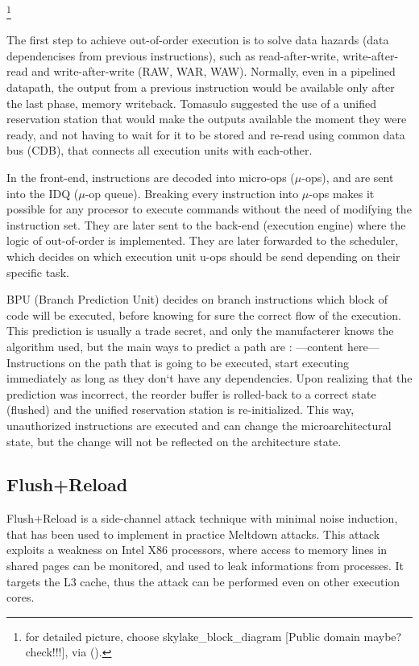 \documentclass[sigconf]{acmart}
\begin{document}
\footnote{ for detailed picture, choose skylake\_block\_diagram [Public domain maybe? check!!!], via (). }

The first step to achieve out-of-order execution is to solve data hazards (data dependencises from previous instructions), such as read-after-write, write-after-read and write-after-write (RAW, WAR, WAW). Normally, even in a pipelined datapath, the output from a previous instruction would be available only after the last phase, memory writeback. Tomasulo \cite{Cohen07} suggested the use of a unified reservation station that would make the outputs available the moment they were ready, and not having to wait for it to be stored and re-read using common data bus (CDB), that connects all execution units with each-other. 

In the front-end, instructions are decoded into micro-ops ($\mu$-ops), and are sent into the IDQ ($\mu$-op queue). Breaking every instruction into $\mu$-ops makes it possible for any procesor to execute commands without the need of modifying the instruction set. They are later sent to the back-end (execution engine) where the logic of out-of-order is implemented. They are later forwarded to the scheduler, which decides on which execution unit u-ops should be send depending on their specific task. 

BPU (Branch Prediction Unit) decides on branch instructions which block of code will be executed, before knowing for sure the correct flow of the execution. This prediction is usually a trade secret, and only the manufacterer knows the algorithm used, but the main ways to predict a path are : ---content here--- Instructions on the path that is going to be executed, start executing immediately as long as they don‘t have any dependencies. Upon realizing that the prediction was incorrect, the reorder buffer is rolled-back to a correct state (flushed) and the unified reservation station is re-initialized. This way, unauthorized instructions are executed and can change the microarchitectural state, but the change will not be reflected on the architecture state. 

\subsection{Flush+Reload}

Flush+Reload\cite{Knuth97} is a side-channel attack technique with minimal noise induction, that has been used to implement in practice Meltdown attacks. This attack exploits a weakness on Intel X86 processors, where access to memory lines in shared pages can be monitored, and used to leak informations from processes. It targets the L3 cache, thus the attack can be performed even on other execution cores. 
\end{document}
